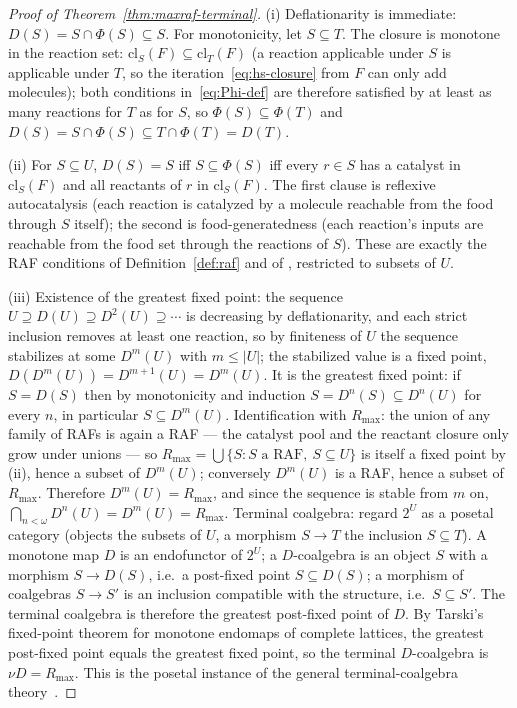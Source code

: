 \documentclass[11pt,a4paper]{article}
\theoremstyle{plain}
\theoremstyle{definition}
\theoremstyle{remark}
\begin{document}
\begin{proof}[Proof of Theorem~\ref{thm:maxraf-terminal}]
(i) Deflationarity is immediate: $D(S)=S\cap\Phi(S)\subseteq S$.
For monotonicity, let $S\subseteq T$. The closure is monotone in
the reaction set: $\mathrm{cl}_{S}(F)\subseteq\mathrm{cl}_{T}(F)$
(a reaction applicable under $S$ is applicable under $T$, so the
iteration~\eqref{eq:hs-closure} from $F$ can only add molecules);
both conditions in~\eqref{eq:Phi-def} are therefore satisfied by at
least as many reactions for $T$ as for $S$, so
$\Phi(S)\subseteq\Phi(T)$ and
$D(S)=S\cap\Phi(S)\subseteq T\cap\Phi(T)=D(T)$.

(ii) For $S\subseteq U$, $D(S)=S$ iff $S\subseteq\Phi(S)$ iff
every $r\in S$ has a catalyst in $\mathrm{cl}_{S}(F)$ and all
reactants of $r$ in $\mathrm{cl}_{S}(F)$. The
first clause is reflexive autocatalysis (each reaction is catalyzed
by a molecule reachable from the food through $S$ itself); the
second is food-generatedness (each reaction's inputs are reachable
from the food set through the reactions of $S$). These are exactly
the RAF conditions of Definition~\ref{def:raf} and
of \citealp{hordijk2011,steel2004}, restricted to subsets of $U$.

(iii) Existence of the greatest fixed point: the sequence
$U\supseteq D(U)\supseteq D^{2}(U)\supseteq\cdots$ is decreasing
by deflationarity, and each strict inclusion removes at least one
reaction, so by finiteness of $U$ the sequence stabilizes at some
$D^{m}(U)$ with $m\leq|U|$; the stabilized value is a fixed point,
$D(D^{m}(U))=D^{m+1}(U)=D^{m}(U)$. It is the greatest fixed
point: if $S=D(S)$ then by monotonicity and induction
$S=D^{n}(S)\subseteq D^{n}(U)$ for every $n$, in particular
$S\subseteq D^{m}(U)$. Identification with $R_{\max}$: the union
of any family of RAFs is again a RAF --- the catalyst pool and
the reactant closure only grow under unions --- so
$R_{\max}=\bigcup\{S : S\text{ a RAF},\ S\subseteq U\}$ is itself
a fixed point by (ii), hence a subset of $D^{m}(U)$; conversely
$D^{m}(U)$ is a RAF, hence a subset of $R_{\max}$. Therefore
$D^{m}(U)=R_{\max}$, and since the sequence is stable from $m$
on, $\bigcap_{n<\omega}D^{n}(U)=D^{m}(U)=R_{\max}$. Terminal
coalgebra: regard $2^{U}$ as a posetal category (objects the
subsets of $U$, a morphism $S\to T$ the inclusion $S\subseteq T$).
A monotone map $D$ is an endofunctor of $2^{U}$; a $D$-coalgebra
is an object $S$ with a morphism $S\to D(S)$, i.e.\ a post-fixed
point $S\subseteq D(S)$; a morphism of coalgebras $S\to S'$ is an
inclusion compatible with the structure, i.e.\ $S\subseteq S'$.
The terminal coalgebra is therefore the greatest post-fixed
point of $D$. By Tarski's fixed-point theorem for monotone
endomaps of complete lattices, the greatest post-fixed point
equals the greatest fixed point, so the terminal $D$-coalgebra is
$\nu D=R_{\max}$. This is the posetal instance of the general
terminal-coalgebra theory~\citep{adamek2005,worrell2005}.


\end{proof}
\end{document}
